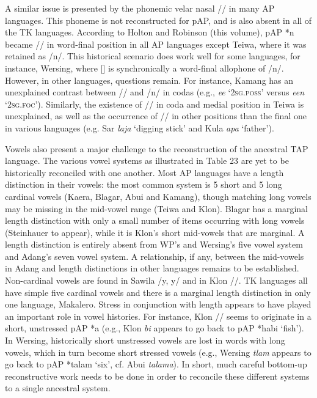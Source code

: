 A similar issue is presented by the phonemic velar nasal /{\ng}/ in many AP languages. This phoneme is not reconstructed for pAP, and is also absent in all of the TK languages. According to Holton and Robinson (this volume), pAP *n became /{\ng}/ in word-final position in all AP languages except Teiwa, where it was retained as /n/. This historical scenario does work well for some languages, for instance, Wersing, where [{\ng}] is synchronically a word-final allophone of /n/. However, in other languages, questions remain. For instance, Kamang has an unexplained contrast between /{\ng}/ and /n/ in codas (e.g., \textit{ee{\ng}} `\textsc{2sg.poss'} versus \textit{een} `\textsc{2sg.foc'}). Similarly, the existence of /{\ng}/ in coda and medial position in Teiwa is unexplained, as well as the occurrence of /{\ng}/ in other positions than the final one in various languages (e.g. Sar \textit{la{\ng}ja} `digging stick' and Kula \textit{{\ng}apa} `father').

Vowels also present a major challenge to the reconstruction of the ancestral TAP language. The various vowel systems as illustrated in Table 23 are yet to be historically reconciled with one another. Most AP languages have a length distinction in their vowels: the most common system is 5 short and 5 long cardinal vowels (Kaera, Blagar, Abui and Kamang), though matching long vowels may be missing in the mid-vowel range (Teiwa and Klon). Blagar has a marginal length distinction with only a small number of items occurring with long vowels (Steinhauer to appear), while it is Klon's short mid-vowels that are marginal. A length distinction is entirely absent from WP's and Wersing's five vowel system and Adang's seven vowel system. A relationship, if any, between the mid-vowels in Adang and length distinctions in other languages remains to be established. Non-cardinal vowels are found in Sawila /y, y{\textlengthmark}/ and in Klon /{\textschwa}/. TK languages all have simple five cardinal vowels and there is a
marginal length distinction in only one language, Makalero. Stress in conjunction with length appears to have played an important role in vowel histories. For instance, Klon /{\textschwa}/ seems to originate in a short, unstressed pAP *a (e.g., Klon \textit{{\textschwa}bi} appears to go back to pAP *ha{\textprimstress}bi `fish'). In Wersing, historically short unstressed vowels are lost in words with long vowels, which in turn become short stressed vowels (e.g., Wersing \textit{tlam} appears to go back to pAP *tala{\textlengthmark}m `six', cf. Abui \textit{tala{\textlengthmark}ma}). In short, much careful bottom-up reconstructive work needs to be done in order to reconcile these different systems to a single ancestral system.


